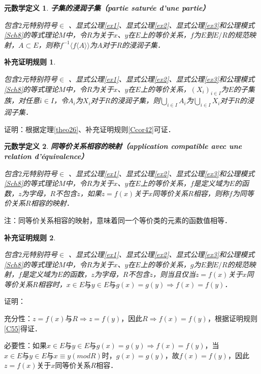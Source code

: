 \documentclass[12pt, a4paper, oneside]{book}
\newtheorem{metadef}{元数学定义}
\newtheorem{Ccor}{补充证明规则}
\begin{document}
			\begin{metadef}
				\textbf{子集的浸润子集（partie saturée d'une partie）}
				\par
				包含$2$元特别符号$\in$ 、显式公理\ref{ex1}、显式公理\ref{ex2}、显式公理\ref{ex3}和公理模式\ref{Sch8}的等式理论$M$中，令$R$为关于$x$、$y$在$E$上的等价关系，$f$为$E$到$E/R$的规范映射，$A\subset E$，则称$f^{-1}\langle f\langle A \rangle \rangle$为$A$对于$R$的浸润子集．
			\end{metadef}
			
			\begin{Ccor}\label{Ccor47}
				\hfill\par
				包含$2$元特别符号$\in$ 、显式公理\ref{ex1}、显式公理\ref{ex2}、显式公理\ref{ex3}和公理模式\ref{Sch8}的等式理论$M$中，令$R$为关于$x$、$y$在$E$上的等价关系，$(X_i)_{i\in I}$为$E$的子集族，对任意$i\in I$，令$A_i$为$X_i$对于$R$的浸润子集，则$\bigcup\limits_{i\in I}A_i$为$\bigcup\limits_{i\in I}X_i$对于$R$的浸润子集．
			\end{Ccor}
			证明：根据定理\ref{theo26}、补充证明规则\ref{Ccor42}可证．

			\begin{metadef}
				\textbf{同等价关系相容的映射（application compatible avec une relation d'équivalence）}
				\par
				包含$2$元特别符号$\in$ 、显式公理\ref{ex1}、显式公理\ref{ex2}、显式公理\ref{ex3}和公理模式\ref{Sch8}的等式理论$M$中，令$R$为关于$x$、$y$在$E$上的等价关系，$f$是定义域为$E$的函数，$z$为字母，$R$不包含$z$，如果$z=f(x)$关于$x$同等价关系$R$相容，则称$f$为同等价关系$R$相容的映射．
			\end{metadef}
			注：同等价关系相容的映射，意味着同一个等价类的元素的函数值相等．
			
			\begin{Ccor}\label{Ccor48}
				\hfill\par
				包含$2$元特别符号$\in$ 、显式公理\ref{ex1}、显式公理\ref{ex2}、显式公理\ref{ex3}和公理模式\ref{Sch8}的等式理论$M$中，令$R$为关于$x$、$y$在$E$上的等价关系，$g$为$E$到$E/R$的规范映射，$f$是定义域为$E$的函数，$z$为字母，$R$不包含$z$，则当且仅当$z=f(x)$关于$x$同等价关系$R$相容时，$x\in E\text{与}y\in E\text{与}g(x)=g(y)\Rightarrow f(x)=f(y)$．
			\end{Ccor}
			证明：
			\par
			充分性：$z=f(x)\text{与}R\Rightarrow z=f(y)$，因此$R\Rightarrow f(x)=f(y)$，根据证明规则\ref{C55}得证．
			\par
			必要性：如果$x\in E\text{与}y\in E\text{与}g(x)=g(y)\Rightarrow f(x)=f(y)$，当$x\in E\text{与}y\in E\text{与}x\equiv y(mod R)$时，$g(x)=g(y)$，故$f(x)=f(y)$，因此$z=f(x)$关于$x$同等价关系$R$相容．
\end{document}
